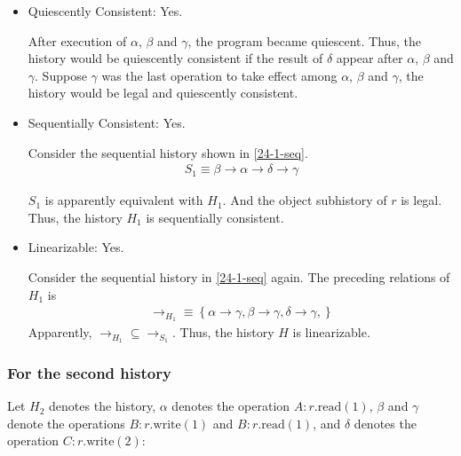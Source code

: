 \documentclass[]{article}
\begin{document}
\begin{itemize}
    \item Quiescently Consistent: Yes.

        After execution of $\alpha$, $\beta$ and $\gamma$, the program became
        quiescent. Thus, the history would be quiescently consistent if the
        result of $\delta$ appear after $\alpha$, $\beta$ and $\gamma$. Suppose
        $\gamma$ was the last operation to take effect among $\alpha$, $\beta$
        and $\gamma$, the history would be legal and quiescently consistent.

    \item Sequentially Consistent: Yes.

        Consider the sequential history shown in \cref{24-1-seq}.
        \begin{align}
            \label{24-1-seq}
            S_1 \equiv \beta \rightarrow \alpha \rightarrow \delta \rightarrow \gamma
        \end{align}

        $S_1$ is apparently equivalent with $H_1$. And the object subhistory of
        $r$ is legal. Thus, the history $H_1$ is sequentially consistent.

    \item Linearizable: Yes.

        Consider the sequential history in \cref{24-1-seq} again. The preceding
        relations of $H_1$ is
        \begin{align}
            \rightarrow_{H_1} \equiv \left\{ 
                \alpha \rightarrow \gamma,
                \beta \rightarrow \gamma,
                \delta \rightarrow \gamma,
            \right\}
        \end{align}
        Apparently, $\rightarrow_{H_1} \subseteq \rightarrow_{S_1}$. Thus, the
        history $H$ is linearizable.
\end{itemize}

\subsubsection*{For the second history}

Let $H_2$ denotes the history, $\alpha$ denotes the
operation $A:r.\mathrm{read}(1)$, $\beta$ and $\gamma$ denote the operations
$B:r.\mathrm{write}(1)$ and $B:r.\mathrm{read}(1)$, and $\delta$ denotes the
operation $C:r.\mathrm{write}(2)$:
\end{document}
